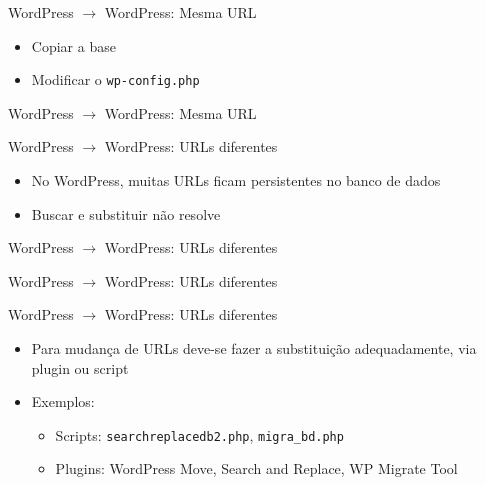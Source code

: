 \documentclass{beamer}
\begin{document}
\begin{frame}{WordPress $\rightarrow$ WordPress: Mesma URL}
\begin{itemize}
  \pause \item Copiar a base
  \pause \item Modificar o \texttt{wp-config.php}
\end{itemize}
\end{frame}

\begin{frame}[fragile]{WordPress $\rightarrow$ WordPress: Mesma URL}
  
\end{frame}

\begin{frame}{WordPress $\rightarrow$ WordPress: URLs diferentes}
\begin{itemize}
  \pause \item No WordPress, muitas URLs ficam persistentes no banco de dados
  \pause \item Buscar e substituir não resolve
\end{itemize}
\end{frame}

\begin{frame}[fragile]{WordPress $\rightarrow$ WordPress: URLs diferentes}
  
  \pause
  
\end{frame}

\begin{frame}[fragile]{WordPress $\rightarrow$ WordPress: URLs diferentes}
  
  \pause
  
  \pause
  
\end{frame}

\begin{frame}{WordPress $\rightarrow$ WordPress: URLs diferentes}
\begin{itemize}
  \item Para mudança de URLs deve-se fazer a substituição
        adequadamente, via plugin ou script
  \pause \item Exemplos:
  \begin{itemize}
    \item Scripts: \texttt{searchreplacedb2.php}, \texttt{migra\_bd.php}
    \item Plugins: WordPress Move, Search and Replace, WP Migrate Tool
  \end{itemize}
\end{itemize}
\end{frame}
\end{document}
